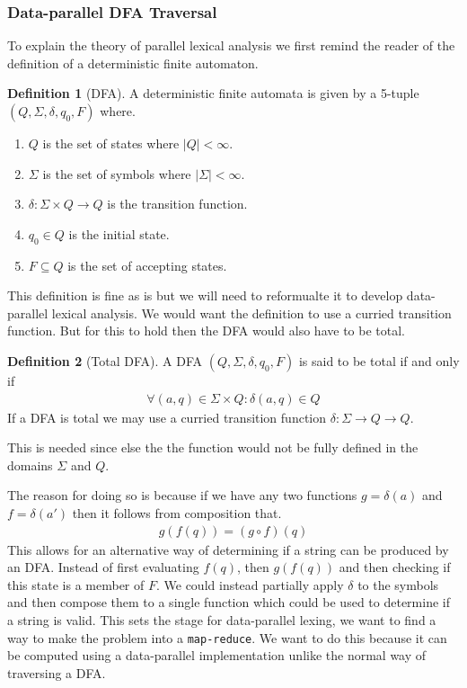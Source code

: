 \documentclass[a4paper,12pt]{article}
\theoremstyle{definition}
\newtheorem{definition}{Definition}[section]
\begin{document}
\subsubsection{Data-parallel DFA Traversal}
To explain the theory of parallel lexical analysis we first remind the reader of the definition of a deterministic finite automaton.
\begin{definition}[DFA]
  A deterministic finite automata \cite{10.5555/1196416} \cite{enwiki:1192025610} is given by a 5-tuple $(Q, \Sigma, \delta, q_0, F)$ where.
  \begin{enumerate}
    \item $Q$ is the set of states where $|Q| < \infty$.
    \item $\Sigma$ is the set of symbols where $|\Sigma| < \infty$.
    \item $\delta: \Sigma \times Q \to Q$ is the transition function.
    \item $q_0 \in Q$ is the initial state.
    \item $F\subseteq Q$ is the set of accepting states.
  \end{enumerate}
\end{definition}
\noindent This definition is fine as is but we will need to reformualte it to develop data-parallel lexical analysis. We would want the definition to use a curried transition function. But for this to hold then the DFA would also have to be total.
\begin{definition}[Total DFA]
  A DFA $(Q, \Sigma, \delta, q_0, F)$ is said to be total if and only if
  \begin{align*}
    \forall (a, q) \in \Sigma \times Q: \delta(a, q) \in Q 
  \end{align*}
  If a DFA is total we may use a curried transition function $\delta: \Sigma \to Q \to Q$.
\end{definition}
\noindent This is needed since else the the function would not be fully defined in the domains $\Sigma$ and $Q$.

The reason for doing so is because if we have any two functions $g = \delta(a)$ and $f = \delta(a')$ then it follows from composition that.
\begin{align*}
  g(f(q)) = (g \circ f) (q)
\end{align*}
This allows for an alternative way of determining if a string can be produced by an DFA. Instead of first evaluating $f(q)$, then $g(f(q))$ and then checking if this state is a member of $F$. We could instead partially apply $\delta$ to the symbols and then compose them to a single function which could be used to determine if a string is valid. This sets the stage for data-parallel lexing, we want to find a way to make the problem into a \texttt{map-reduce}. We want to do this because it can be computed using a data-parallel implementation unlike the normal way of traversing a DFA.
\end{document}
